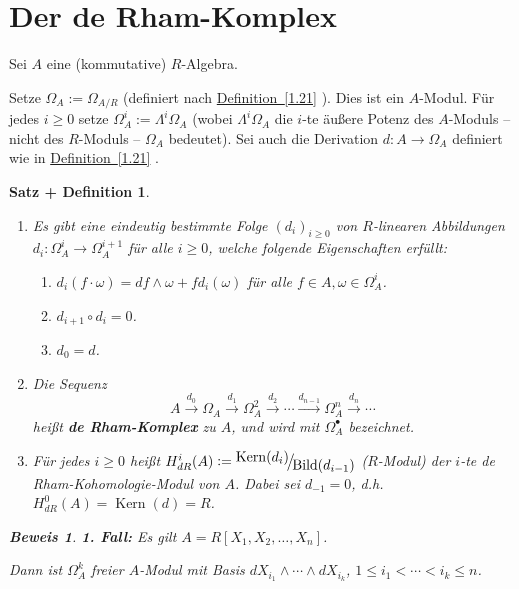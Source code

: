 \documentclass[a4paper,12pt]{scrbook}
\theoremstyle{break}
\newtheorem{SatzDef}[Satz]{Satz + Definition}
\theoremstyle{nonumberbreak}
\newtheorem{Bew}{Beweis}
\theoremstyle{nonumberplain}
\newcommand{\emp}[1]{\textbf{\emph{#1}}}
\newcommand{\defeqr}[0]{\mathrel{\mathop:}=}
\newcommand{\myref}[2]{%
\hyperref[#2]{#1~\ref*{#2}}%
}
\DeclareMathOperator{\Kern}{Kern}
\DeclareMathOperator{\Bild}{Bild}
\newcommand{\FakRaum}[2]{
  \raisebox{0.7ex}{\ensuremath{#1}}
  \ensuremath{\mkern-3mu}\big/\ensuremath{\mkern-3mu}
  \raisebox{-0.6ex}{\ensuremath{#2}}}
\begin{document}
\section{Der de Rham-Komplex}

Sei $A$ eine (kommutative) $R$-Algebra.

Setze $\Omega_A := \Omega_{A/R}$ (definiert nach \myref{Definition}{1.21}). Dies ist ein $A$-Modul. Für jedes $i\geq 0$ setze $\Omega^i_A := \Lambda^i\Omega_A$ (wobei $\Lambda^i \Omega_A$ die $i$-te äußere Potenz des $A$-Moduls -- nicht des $R$-Moduls -- $\Omega_A$ bedeutet). Sei auch die Derivation $d : A \to \Omega_A$ definiert wie in \myref{Definition}{1.21}.

\begin{SatzDef}
\begin{enumerate}
\item[a)] Es gibt eine eindeutig bestimmte Folge $\left(d_i\right)_{i\geq 0}$ von $R$-linearen Abbildungen $d_i : \Omega^i_A \rightarrow \Omega^{i+1}_A$ für alle $i \geq 0$, welche folgende Eigenschaften erfüllt:
\begin{enumerate}
\item[(i)] $d_i(f \cdot \omega) = df \wedge \omega + f d_i(\omega)$ für alle $f \in A, \omega \in \Omega^i_A$.
\item[(ii)] $d_{i+1} \circ d_i = 0$.
\item[(iii)] $d_0 = d$.
\end{enumerate}

\item[b)]
Die Sequenz
$$A \overset{d_0}{\rightarrow} \Omega_A \overset{d_1}{\rightarrow} \Omega^2_A \overset{d_2}{\rightarrow} \cdots \overset{d_{n-1}}{\rightarrow} \Omega^n_A  \overset{d_n}{\rightarrow} \cdots$$
heißt \emp{de Rham-Komplex} zu $A$, und wird mit $\Omega^\bullet_A$ bezeichnet.

\item[c)]
Für jedes $i\geq 0$ hei\ss t $H_{dR}^i(A)\defeqr \FakRaum{\Kern(d_i)}{\Bild(d_{i-1})}$ ($R$-Modul)
der $i$-te de Rham-Kohomologie-Modul von $A$. Dabei sei $d_{-1}=0$, d.h. $H_{dR}^0(A)=\Kern(d)=R$.

\end{enumerate}

\begin{Bew}
\textbf{1. Fall:} Es gilt $A = R[X_1, X_2, \ldots , X_n]$.

Dann ist $\Omega^k_A$ freier $A$-Modul mit Basis $d X_{i_1} \wedge \cdots \wedge d X_{i_k}$, $1 \leq i_1 < \cdots < i_k \leq n$.


\end{Bew}
\end{SatzDef}
\end{document}
